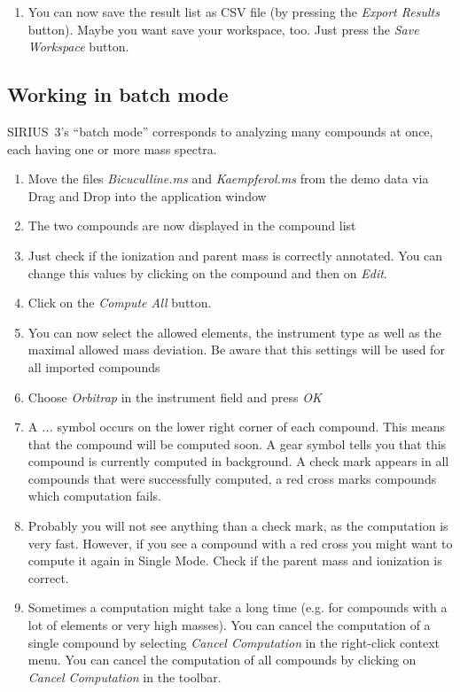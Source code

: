 \documentclass[letterpaper,10pt,openany,oneside]{sphinxmanual}
\begin{document}
\begin{enumerate}
\item {} 
You can now save the result list as CSV file (by pressing the \emph{Export Results} button). Maybe you want save your workspace, too. Just press the \emph{Save Workspace} button.

\end{enumerate}


\subsection{Working in batch mode}

SIRIUS~3's ``batch mode'' corresponds to analyzing many compounds at once,
each having one or more mass spectra.

\begin{enumerate}
\item {} 
Move the files \emph{Bicuculline.ms} and \emph{Kaempferol.ms} from the demo data via Drag and Drop into the application window

\item {} 
The two compounds are now displayed in the compound list

\item {} 
Just check if the ionization and parent mass is correctly annotated. You can change this values by clicking on the compound and then on \emph{Edit}.

\item {} 
Click on the \emph{Compute All} button.

\item {} 
You can now select the allowed elements, the instrument type as well as the maximal allowed mass deviation. Be aware that this settings will be used for all imported compounds

\item {} 
Choose \emph{Orbitrap} in the instrument field and press \emph{OK}

\item {} 
A \emph{...} symbol occurs on the lower right corner of each compound. This 
means that the compound will be computed soon. A gear symbol tells you that 
this compound is currently computed in background. A check mark appears in 
all compounds that were successfully computed, a red cross marks compounds 
which computation fails.

\item {} 
Probably you will not see anything than a check mark, as the computation is very fast. However, if you see a compound with a red cross you might want to compute it again in Single Mode. Check if the parent mass and ionization is correct.

\item {} 
Sometimes a computation might take a long time (e.g. for compounds with a lot 
of elements or very high masses). You can cancel the computation of a single 
compound by selecting \emph{Cancel Computation} in the right-click context 
menu. You can cancel the computation of all compounds by clicking on 
\emph{Cancel Computation} in the toolbar.
\end{enumerate}
\end{document}
